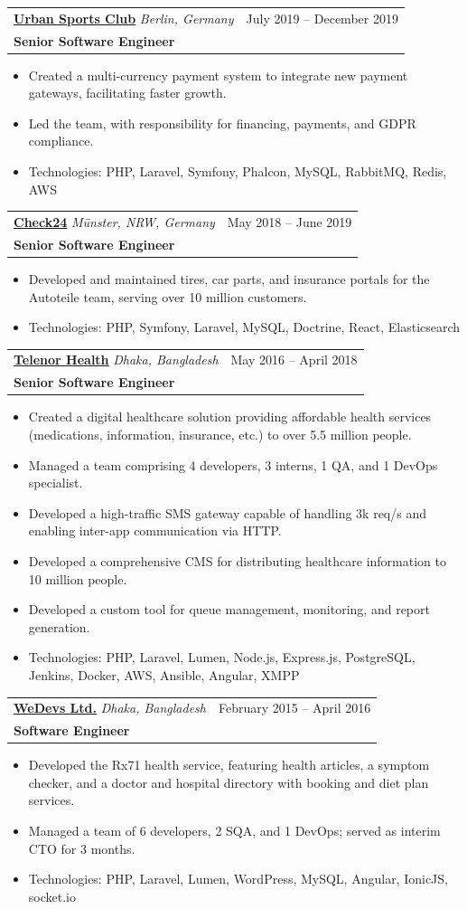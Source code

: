 \documentclass[a4paper,11pt]{article}
\makeatletter
\newcommand{\resumeSubheading}[4]{
    \vspace{1.6pt}\item
        \begin{tabular*}{0.97\textwidth}[t]{l@{\extracolsep{\fill}}r}
            \textbf{\large{\underline{#1}}} \footnotesize{\textit{#4}} & #2 \\[3pt]
            \textbf{#3}
        \end{tabular*}\vspace{-7pt}
}
\newcommand{\resumeItemListStart}{\begin{itemize}}
\newcommand{\resumeItemListEnd}{\end{itemize}\vspace{-5pt}}
\newcommand{\resumeItem}[1]{
    \item\small{
        {#1 \vspace{-2pt}}
    }
}
\makeatother
\begin{document}
        \resumeSubheading
            {\href{https://urbansportsclub.com}{Urban Sports Club}} {July 2019 -- December 2019}
            {Senior Software Engineer}{Berlin, Germany}
            \resumeItemListStart
                \resumeItem{Created a multi-currency payment system to integrate new payment gateways, facilitating faster growth.}
                \resumeItem{Led the team, with responsibility for financing, payments, and GDPR compliance.}
                \resumeItem{Technologies: PHP, Laravel, Symfony, Phalcon, MySQL, RabbitMQ, Redis, AWS}
            \resumeItemListEnd

        \resumeSubheading
            {\href{http://check24.de}{Check24}} {May 2018 -- June 2019}
            {Senior Software Engineer}{Münster, NRW, Germany}
            \resumeItemListStart
                \resumeItem{Developed and maintained tires, car parts, and insurance portals for the Autoteile team, serving over 10 million customers.}
                \resumeItem{Technologies: PHP, Symfony, Laravel, MySQL, Doctrine, React, Elasticsearch}
            \resumeItemListEnd
            
        \resumeSubheading
            {\href{https://telenorhealth.com}{Telenor Health}} {May 2016 -- April 2018}
            {Senior Software Engineer}{Dhaka, Bangladesh}
            \resumeItemListStart
                \resumeItem{Created a digital healthcare solution providing affordable health services (medications, information, insurance, etc.) to over 5.5 million people.}
                \resumeItem{Managed a team comprising 4 developers, 3 interns, 1 QA, and 1 DevOps specialist.}
                \resumeItem{Developed a high-traffic SMS gateway capable of handling 3k req/s and enabling inter-app communication via HTTP.}
                \resumeItem{Developed a comprehensive CMS for distributing healthcare information to 10 million people.}
                \resumeItem{Developed a custom tool for queue management, monitoring, and report generation.}
                \resumeItem{Technologies: PHP, Laravel, Lumen, Node.js, Express.js, PostgreSQL, Jenkins, Docker, AWS, Ansible, Angular, XMPP}
            \resumeItemListEnd
            
        \resumeSubheading
            {\href{https://wedevs.com}{WeDevs Ltd.}} {February 2015 -- April 2016}
            {Software Engineer}{Dhaka, Bangladesh}
            \resumeItemListStart
                \resumeItem{Developed the Rx71 health service, featuring health articles, a symptom checker, and a doctor and hospital directory with booking and diet plan services.}
                \resumeItem{Managed a team of 6 developers, 2 SQA, and 1 DevOps; served as interim CTO for 3 months.}
                \resumeItem{Technologies: PHP, Laravel, Lumen, WordPress, MySQL, Angular, IonicJS, socket.io}
            \resumeItemListEnd
            
\end{document}
